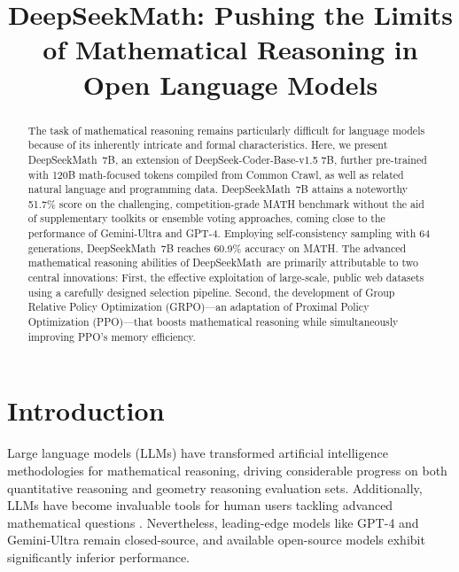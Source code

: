\title{DeepSeekMath: Pushing the Limits of Mathematical Reasoning in Open Language Models}

\begin{abstract}
The task of mathematical reasoning remains particularly difficult for language models because of its inherently intricate and formal characteristics. Here, we present DeepSeekMath~7B, an extension of DeepSeek-Coder-Base-v1.5 7B, further pre-trained with 120B math-focused tokens compiled from Common Crawl, as well as related natural language and programming data. DeepSeekMath~7B attains a noteworthy 51.7\% score on the challenging, competition-grade MATH benchmark without the aid of supplementary toolkits or ensemble voting approaches, coming close to the performance of Gemini-Ultra and GPT-4. Employing self-consistency sampling with 64 generations, DeepSeekMath~7B reaches 60.9\% accuracy on MATH. The advanced mathematical reasoning abilities of DeepSeekMath~are primarily attributable to two central innovations: First, the effective exploitation of large-scale, public web datasets using a carefully designed selection pipeline. Second, the development of Group Relative Policy Optimization (GRPO)—an adaptation of Proximal Policy Optimization (PPO)—that boosts mathematical reasoning while simultaneously improving PPO’s memory efficiency.
\end{abstract}

\section{Introduction}

Large language models (LLMs) have transformed artificial intelligence methodologies for mathematical reasoning, driving considerable progress on both quantitative reasoning \citep{MATH} and geometry reasoning \citep{trinh2024solving} evaluation sets. Additionally, LLMs have become invaluable tools for human users tackling advanced mathematical questions \citep{tao}. Nevertheless, leading-edge models like GPT-4 \citep{gpt4} and Gemini-Ultra \citep{gemini} remain closed-source, and available open-source models exhibit significantly inferior performance.

